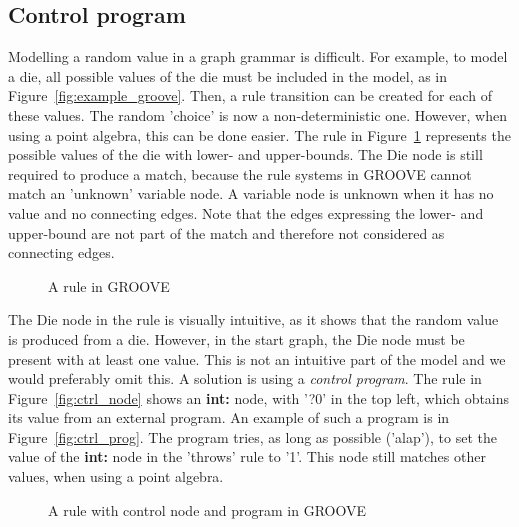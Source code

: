 \subsection{Control program}
Modelling a random value in a graph grammar is difficult. For example, to model a die, all possible values of the die must be included in the model, as in Figure~\ref{fig:example_groove}. Then, a rule transition can be created for each of these values. The random 'choice' is now a non-deterministic one. However, when using a point algebra, this can be done easier. The rule in Figure~\ref{fig:placeholder_rule} represents the possible values of the die with lower- and upper-bounds. The Die node is still required to produce a match, because the rule systems in GROOVE cannot match an 'unknown' variable node. A variable node is unknown when it has no value and no connecting edges. Note that the edges expressing the lower- and upper-bound are not part of the match and therefore not considered as connecting edges.

\begin{figure}[ht]
  \begin{center}
    
  \end{center}
  \caption{A rule in GROOVE}
  \label{fig:placeholder_rule}
\end{figure}

The Die node in the rule is visually intuitive, as it shows that the random value is produced from a die. However, in the start graph, the Die node must be present with at least one value. This is not an intuitive part of the model and we would preferably omit this. A solution is using a \textit{control program}. The rule in Figure~\ref{fig:ctrl_node} shows an \textbf{int:} node, with '?0' in the top left, which obtains its value from an external program. An example of such a program is in Figure~\ref{fig:ctrl_prog}. The program tries, as long as possible ('alap'), to set the value of the \textbf{int:} node in the 'throws' rule to '1'. This node still matches other values, when using a point algebra.

\begin{figure}[ht]
  \begin{center}
  \end{center}
  \caption{A rule with control node and program in GROOVE}
  \label{fig:ctrl_program}
\end{figure}

